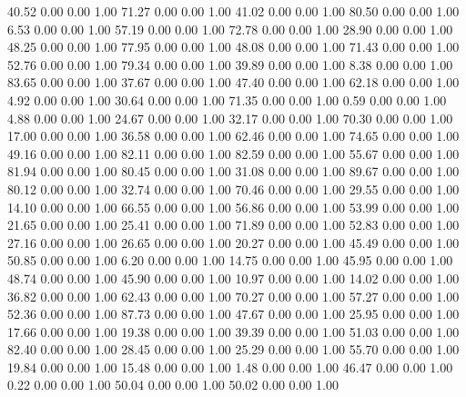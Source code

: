    40.52   0.00   0.00   1.00
   71.27   0.00   0.00   1.00
   41.02   0.00   0.00   1.00
   80.50   0.00   0.00   1.00
    6.53   0.00   0.00   1.00
   57.19   0.00   0.00   1.00
   72.78   0.00   0.00   1.00
   28.90   0.00   0.00   1.00
   48.25   0.00   0.00   1.00
   77.95   0.00   0.00   1.00
   48.08   0.00   0.00   1.00
   71.43   0.00   0.00   1.00
   52.76   0.00   0.00   1.00
   79.34   0.00   0.00   1.00
   39.89   0.00   0.00   1.00
    8.38   0.00   0.00   1.00
   83.65   0.00   0.00   1.00
   37.67   0.00   0.00   1.00
   47.40   0.00   0.00   1.00
   62.18   0.00   0.00   1.00
    4.92   0.00   0.00   1.00
   30.64   0.00   0.00   1.00
   71.35   0.00   0.00   1.00
    0.59   0.00   0.00   1.00
    4.88   0.00   0.00   1.00
   24.67   0.00   0.00   1.00
   32.17   0.00   0.00   1.00
   70.30   0.00   0.00   1.00
   17.00   0.00   0.00   1.00
   36.58   0.00   0.00   1.00
   62.46   0.00   0.00   1.00
   74.65   0.00   0.00   1.00
   49.16   0.00   0.00   1.00
   82.11   0.00   0.00   1.00
   82.59   0.00   0.00   1.00
   55.67   0.00   0.00   1.00
   81.94   0.00   0.00   1.00
   80.45   0.00   0.00   1.00
   31.08   0.00   0.00   1.00
   89.67   0.00   0.00   1.00
   80.12   0.00   0.00   1.00
   32.74   0.00   0.00   1.00
   70.46   0.00   0.00   1.00
   29.55   0.00   0.00   1.00
   14.10   0.00   0.00   1.00
   66.55   0.00   0.00   1.00
   56.86   0.00   0.00   1.00
   53.99   0.00   0.00   1.00
   21.65   0.00   0.00   1.00
   25.41   0.00   0.00   1.00
   71.89   0.00   0.00   1.00
   52.83   0.00   0.00   1.00
   27.16   0.00   0.00   1.00
   26.65   0.00   0.00   1.00
   20.27   0.00   0.00   1.00
   45.49   0.00   0.00   1.00
   50.85   0.00   0.00   1.00
    6.20   0.00   0.00   1.00
   14.75   0.00   0.00   1.00
   45.95   0.00   0.00   1.00
   48.74   0.00   0.00   1.00
   45.90   0.00   0.00   1.00
   10.97   0.00   0.00   1.00
   14.02   0.00   0.00   1.00
   36.82   0.00   0.00   1.00
   62.43   0.00   0.00   1.00
   70.27   0.00   0.00   1.00
   57.27   0.00   0.00   1.00
   52.36   0.00   0.00   1.00
   87.73   0.00   0.00   1.00
   47.67   0.00   0.00   1.00
   25.95   0.00   0.00   1.00
   17.66   0.00   0.00   1.00
   19.38   0.00   0.00   1.00
   39.39   0.00   0.00   1.00
   51.03   0.00   0.00   1.00
   82.40   0.00   0.00   1.00
   28.45   0.00   0.00   1.00
   25.29   0.00   0.00   1.00
   55.70   0.00   0.00   1.00
   19.84   0.00   0.00   1.00
   15.48   0.00   0.00   1.00
    1.48   0.00   0.00   1.00
   46.47   0.00   0.00   1.00
    0.22   0.00   0.00   1.00
   50.04   0.00   0.00   1.00
   50.02   0.00   0.00   1.00
